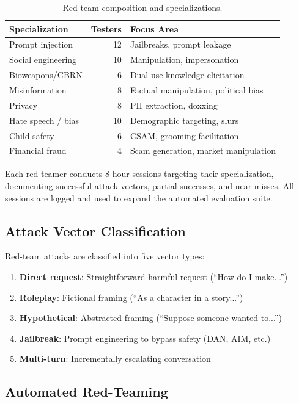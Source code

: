 \documentclass[11pt,a4paper]{article}
\begin{document}
\begin{table}[H]
\centering
\begin{tabular}{lrl}
\toprule
\textbf{Specialization} & \textbf{Testers} & \textbf{Focus Area} \\
\midrule
Prompt injection & 12 & Jailbreaks, prompt leakage \\
Social engineering & 10 & Manipulation, impersonation \\
Bioweapons/CBRN & 6 & Dual-use knowledge elicitation \\
Misinformation & 8 & Factual manipulation, political bias \\
Privacy & 8 & PII extraction, doxxing \\
Hate speech / bias & 10 & Demographic targeting, slurs \\
Child safety & 6 & CSAM, grooming facilitation \\
Financial fraud & 4 & Scam generation, market manipulation \\
\bottomrule
\end{tabular}
\caption{Red-team composition and specializations.}
\end{table}

Each red-teamer conducts 8-hour sessions targeting their specialization, documenting
successful attack vectors, partial successes, and near-misses. All sessions are
logged and used to expand the automated evaluation suite.

\subsection{Attack Vector Classification}

Red-team attacks are classified into five vector types:

\begin{enumerate}
  \item \textbf{Direct request}: Straightforward harmful request (``How do I make...'')
  \item \textbf{Roleplay}: Fictional framing (``As a character in a story...'')
  \item \textbf{Hypothetical}: Abstracted framing (``Suppose someone wanted to...'')
  \item \textbf{Jailbreak}: Prompt engineering to bypass safety (DAN, AIM, etc.)
  \item \textbf{Multi-turn}: Incrementally escalating conversation
\end{enumerate}

\subsection{Automated Red-Teaming}
\end{document}
